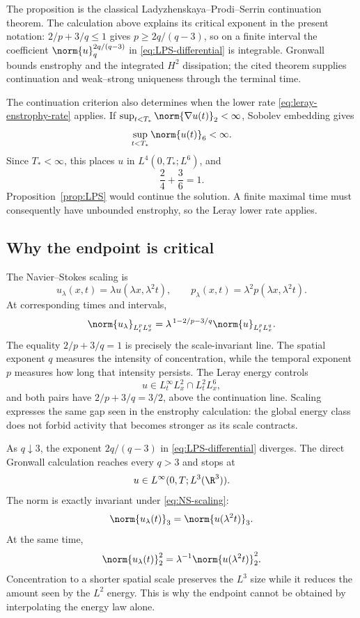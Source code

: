 The proposition is the classical Ladyzhenskaya--Prodi--Serrin continuation
theorem.  The calculation above explains
its critical exponent in the present notation: \(2/p+3/q\le1\) gives
\(p\ge2q/(q-3)\), so on a finite interval the coefficient
\(\norm{u}_q^{2q/(q-3)}\) in \eqref{eq:LPS-differential} is integrable.
Gronwall bounds enstrophy and the integrated \(H^2\) dissipation; the cited
theorem supplies continuation and weak--strong uniqueness through the
terminal time.

The continuation criterion also determines when the lower rate
\eqref{eq:leray-enstrophy-rate} applies.  If
\(\sup_{t<T_*}\norm{\nabla u(t)}_2<\infty\), Sobolev embedding gives
\[
 \sup_{t<T_*}\norm{u(t)}_6<\infty.
\]
Since \(T_*<\infty\), this places \(u\) in \(L^4(0,T_*;L^6)\), and
\[
 \frac24+\frac36=1.
\]
Proposition~\ref{prop:LPS} would continue the solution.  A finite maximal time
must consequently have unbounded enstrophy, so the Leray lower rate applies.

\subsection{Why the endpoint is critical}

The Navier--Stokes scaling is
\begin{equation}
 u_\lambda(x,t)=\lambda u(\lambda x,\lambda^2t),
 \qquad
 p_\lambda(x,t)=\lambda^2p(\lambda x,\lambda^2t).
 \label{eq:NS-scaling}
\end{equation}
At corresponding times and intervals,
\[
 \norm{u_\lambda}_{L^p_tL^q_x}
 =\lambda^{\,1-2/p-3/q}\norm{u}_{L^p_tL^q_x}.
\]
The equality \(2/p+3/q=1\) is precisely the scale-invariant line.  The
spatial exponent \(q\) measures the intensity of concentration, while the
temporal exponent \(p\) measures how long that intensity persists.  The
Leray energy controls
\[
 u\in L^\infty_tL^2_x\cap L^2_tL^6_x,
\]
and both pairs have \(2/p+3/q=3/2\), above the continuation line.  Scaling
expresses the same gap seen in the enstrophy calculation: the global energy
class does not forbid activity that becomes stronger as its scale contracts.

As \(q\downarrow3\), the exponent \(2q/(q-3)\) in
\eqref{eq:LPS-differential} diverges.  The direct Gronwall calculation reaches
every \(q>3\) and stops at
\[
 u\in L^\infty(0,T;L^3(\R^3)).
\]
The norm is exactly invariant under \eqref{eq:NS-scaling}:
\[
 \norm{u_\lambda(t)}_3
 =\norm{u(\lambda^2t)}_3.
\]
At the same time,
\[
 \norm{u_\lambda(t)}_2^2
 =\lambda^{-1}\norm{u(\lambda^2t)}_2^2.
\]
Concentration to a shorter spatial scale preserves the \(L^3\) size while it
reduces the amount seen by the \(L^2\) energy.  This is why the endpoint cannot
be obtained by interpolating the energy law alone.

